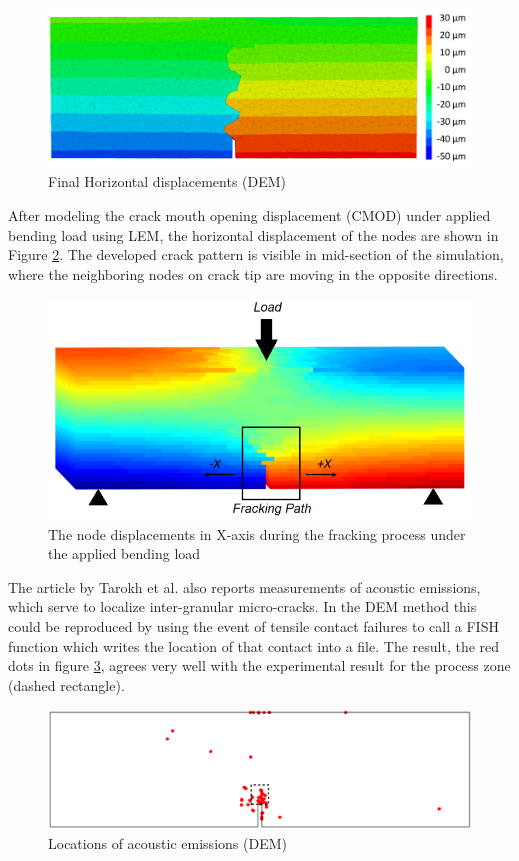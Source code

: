 \begin{figure}[!ht]
\centering
\includegraphics[width=1\textwidth]{figures/ME1-xdis-dem}
\caption{Final Horizontal displacements (DEM)}
\label{fig:ME1-xdis-dem}
\end{figure}

After modeling the crack mouth opening displacement (CMOD) under applied bending load using LEM, the horizontal displacement of the nodes are shown in Figure \ref{fig:Amir_ME1_LEM_Displacement_Crystalline}. The developed crack pattern is visible in mid-section of the simulation, where the neighboring nodes on crack tip are moving in the opposite directions. 

\begin{figure}[!ht]
\centering
\includegraphics[width=1\textwidth]{figures/Amir_ME1_LEM_Displacement_Crystalline.png}
\caption{The node displacements in X-axis during the fracking process under the applied bending load}
\label{fig:Amir_ME1_LEM_Displacement_Crystalline}
\end{figure}

The article by Tarokh et al. also reports measurements of acoustic emissions, which serve to localize inter-granular micro-cracks. In the DEM method this could be 
reproduced by using the event of tensile contact failures to call a FISH function which writes the location of that contact into a file. The result, the red dots in 
figure \ref{fig:ME1-dem-ae}, agrees very well with the experimental result for the process zone (dashed rectangle).

\begin{figure}[!ht]
\centering
\includegraphics[width=1\textwidth]{figures/sample1-ae-tillmax-v2}
\caption{Locations of acoustic emissions (DEM)}
\label{fig:ME1-dem-ae}
\end{figure}

